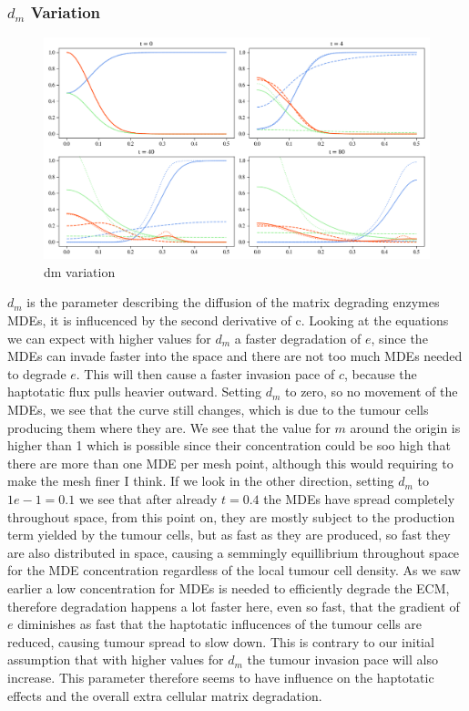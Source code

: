 \subsubsection*{$d_m$ Variation}
\begin{figure}[h]
    \centering
    \includegraphics[width=\textwidth]{resources/images/dm_variation.png}
    \caption{dm variation}
    \label{fig:dm_variation}
\end{figure}
$d_m$ is the parameter describing the diffusion of the matrix degrading enzymes MDEs, it is influcenced by the second derivative of c. Looking at the equations we can expect with higher values for $d_m$ a faster degradation of $e$, since the MDEs can invade faster into the space and there are not too much MDEs needed to degrade $e$. This will then cause a faster invasion pace of $c$, because the haptotatic flux pulls heavier outward.
Setting $d_m$ to zero, so no movement of the MDEs, we see that the curve still changes, which is due to the tumour cells producing them where they are. We see that the value for $m$ around the origin is higher than 1 which is possible since their concentration could be soo high that there are more than one MDE per mesh point, although this would requiring to make the mesh finer I think. 
If we look in the other direction, setting $d_m$ to $1e-1=0.1$ we see that after already $t=0.4$ the MDEs have spread completely throughout space, from this point on, they are mostly subject to the production term yielded by the tumour cells, but as fast as they are produced, so fast they are also distributed in space, causing a semmingly equillibrium throughout space for the MDE concentration regardless of the local tumour cell density. As we saw earlier a low concentration for MDEs is needed to efficiently degrade the ECM, therefore degradation happens a lot faster here, even so fast, that the gradient of $e$ diminishes as fast that the haptotatic influcences of the tumour cells are reduced, causing tumour spread to slow down. This is contrary to our initial assumption that with higher values for $d_m$ the tumour invasion pace will also increase. This parameter therefore seems to have influence on the haptotatic effects and the overall extra cellular matrix degradation.
	


